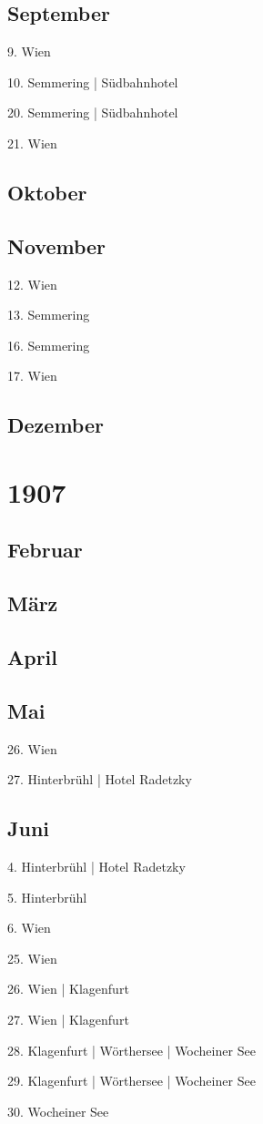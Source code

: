 \documentclass[twoside=false,titlepage=false,open=any, parskip=never, fontsize=10pt, headings=small, chapterprefix=false, appendixprefix=false, DIV=15]{scrbook}
\begin{document}
\begin{multicols}{3}
            \section*{September}
            9. Wien\par
            10. Semmering | Südbahnhotel\par
            20. Semmering | Südbahnhotel\par
            21. Wien\par
            \section*{Oktober}
            \section*{November}
            12. Wien\par
            13. Semmering\par
            16. Semmering\par
            17. Wien\par
            \section*{Dezember}
            \chapter*{1907}
            \section*{Februar}
            \section*{März}
            \section*{April}
            \section*{Mai}
            26. Wien\par
            27. Hinterbrühl | Hotel Radetzky\par
            \section*{Juni}
            4. Hinterbrühl | Hotel Radetzky\par
            5. Hinterbrühl\par
            6. Wien\par
            25. Wien\par
            26. Wien | Klagenfurt\par
            27. Wien | Klagenfurt\par
            28. Klagenfurt | Wörthersee | Wocheiner See\par
            29. Klagenfurt | Wörthersee | Wocheiner See\par
            30. Wocheiner See\par

\end{multicols}
\end{document}
